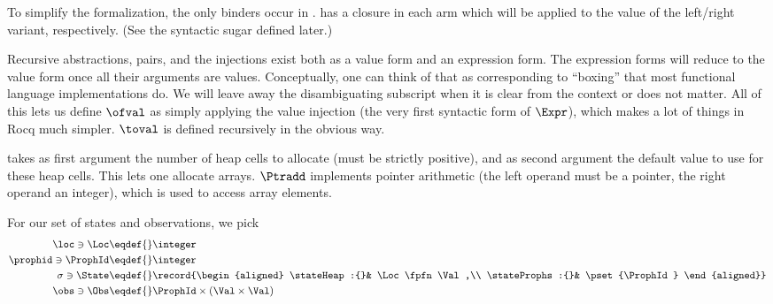 To simplify the formalization, the only binders occur in .
 has a closure in each arm which will be applied to the value of the left/right variant, respectively.
(See the syntactic sugar defined later.)

Recursive abstractions, pairs, and the injections exist both as a value form and an expression form.
The expression forms will reduce to the value form once all their arguments are values.
Conceptually, one can think of that as corresponding to ``boxing'' that most functional language implementations do.
We will leave away the disambiguating subscript when it is clear from the context or does not matter.
All of this lets us define $\ofval$ as simply applying the value injection (the very first syntactic form of $\Expr$), which makes a lot of things in Rocq much simpler.
$\toval$ is defined recursively in the obvious way.

 takes as first argument the number of heap cells to allocate (must be strictly positive), and as second argument the default value to use for these heap cells.
This lets one allocate arrays.
$\Ptradd$ implements pointer arithmetic (the left operand must be a pointer, the right operand an integer), which is used to access array elements.

For our set of states and observations, we pick
\begin{align*}
  \loc \ni \Loc \eqdef{}& \integer \\
  \prophid \ni \ProphId \eqdef{}& \integer \\
  \sigma \ni \State \eqdef{}& \record{\begin{aligned}
                   \stateHeap:{}& \Loc \fpfn \Val,\\
                   \stateProphs:{}& \pset{\ProphId}
                 \end{aligned}} \\
  \obs \ni \Obs \eqdef{}& \ProphId \times (\Val \times \Val)
\end{align*}

